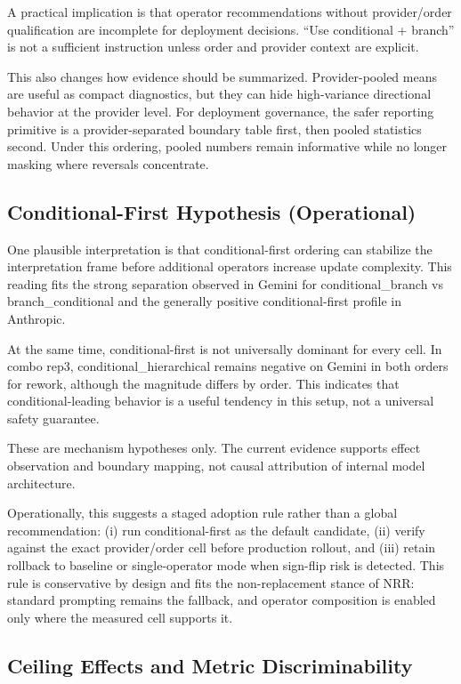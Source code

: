 \documentclass[11pt,a4paper]{article}
\begin{document}
A practical implication is that operator recommendations without provider/order qualification are incomplete for deployment decisions. ``Use conditional + branch'' is not a sufficient instruction unless order and provider context are explicit.

This also changes how evidence should be summarized. Provider-pooled means are useful as compact diagnostics, but they can hide high-variance directional behavior at the provider level. For deployment governance, the safer reporting primitive is a provider-separated boundary table first, then pooled statistics second. Under this ordering, pooled numbers remain informative while no longer masking where reversals concentrate.

\subsection{Conditional-First Hypothesis (Operational)}

One plausible interpretation is that conditional-first ordering can stabilize the interpretation frame before additional operators increase update complexity. This reading fits the strong separation observed in Gemini for conditional\_branch vs branch\_conditional and the generally positive conditional-first profile in Anthropic.

At the same time, conditional-first is not universally dominant for every cell. In combo rep3, conditional\_hierarchical remains negative on Gemini in both orders for rework, although the magnitude differs by order. This indicates that conditional-leading behavior is a useful tendency in this setup, not a universal safety guarantee.

These are mechanism hypotheses only. The current evidence supports effect observation and boundary mapping, not causal attribution of internal model architecture.

Operationally, this suggests a staged adoption rule rather than a global recommendation: (i) run conditional-first as the default candidate, (ii) verify against the exact provider/order cell before production rollout, and (iii) retain rollback to baseline or single-operator mode when sign-flip risk is detected. This rule is conservative by design and fits the non-replacement stance of NRR: standard prompting remains the fallback, and operator composition is enabled only where the measured cell supports it.

\subsection{Ceiling Effects and Metric Discriminability}
\end{document}
